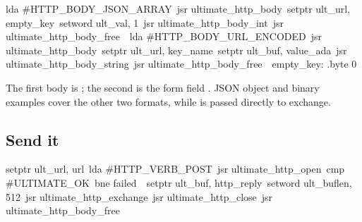 \begin{listingbox}
\hspace*{2em}lda \#HTTP\_BODY\_JSON\_ARRAY\
\hspace*{2em}jsr ultimate\_http\_body\
\hspace*{2em}setptr ult\_url, empty\_key\
\hspace*{2em}setword ult\_val, 1\
\hspace*{2em}jsr ultimate\_http\_body\_int\
\hspace*{2em}jsr ultimate\_http\_body\_free\
\
\hspace*{2em}lda \#HTTP\_BODY\_URL\_ENCODED\
\hspace*{2em}jsr ultimate\_http\_body\
\hspace*{2em}setptr ult\_url, key\_name\
\hspace*{2em}setptr ult\_buf, value\_ada\
\hspace*{2em}jsr ultimate\_http\_body\_string\
\hspace*{2em}jsr ultimate\_http\_body\_free\
\
empty\_key: .byte 0
\end{listingbox}

\begin{resultbox}
The first body is \cmd{[1]}; the second is the form field .
JSON object and binary examples cover the other two formats, while
 is passed directly to exchange.
\end{resultbox}

\subsection*{Send it}

\begin{listingbox}
\hspace*{2em}setptr ult\_url, url\
\hspace*{2em}lda \#HTTP\_VERB\_POST\
\hspace*{2em}jsr ultimate\_http\_open\
\hspace*{2em}cmp \#ULTIMATE\_OK\
\hspace*{2em}bne failed\
\
\hspace*{2em}setptr ult\_buf, http\_reply\
\hspace*{2em}setword ult\_buflen, 512\
\hspace*{2em}jsr ultimate\_http\_exchange\
\hspace*{2em}jsr ultimate\_http\_close\
\hspace*{2em}jsr ultimate\_http\_body\_free
\end{listingbox}

